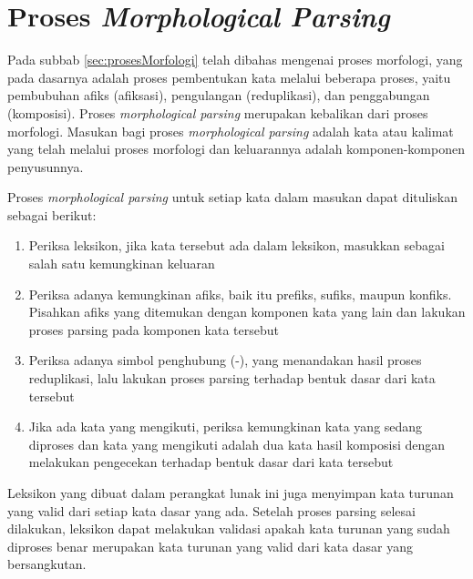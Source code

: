 \section{Proses \textit{Morphological Parsing}}
\label{sec:morphologicalParsing}

Pada subbab \ref{sec:prosesMorfologi} telah dibahas mengenai proses morfologi, yang pada dasarnya adalah proses pembentukan kata melalui beberapa proses, yaitu pembubuhan afiks (afiksasi), pengulangan (reduplikasi), dan penggabungan (komposisi). Proses \textit{morphological parsing} merupakan kebalikan dari proses morfologi. Masukan bagi proses \textit{morphological parsing} adalah kata atau kalimat yang telah melalui proses morfologi dan keluarannya adalah komponen-komponen penyusunnya.

Proses \textit{morphological parsing} untuk setiap kata dalam masukan dapat dituliskan sebagai berikut:
\begin{enumerate}
	\item Periksa leksikon, jika kata tersebut ada dalam leksikon, masukkan sebagai salah satu kemungkinan keluaran
	\item Periksa adanya kemungkinan afiks, baik itu prefiks, sufiks, maupun konfiks. Pisahkan afiks yang ditemukan dengan komponen kata yang lain dan lakukan proses parsing pada komponen kata tersebut
	\item Periksa adanya simbol penghubung (-), yang menandakan hasil proses reduplikasi, lalu lakukan proses parsing terhadap bentuk dasar dari kata tersebut
	\item Jika ada kata yang mengikuti, periksa kemungkinan kata yang sedang diproses dan kata yang mengikuti adalah dua kata hasil komposisi dengan melakukan pengecekan terhadap bentuk dasar dari kata tersebut
\end{enumerate}

Leksikon yang dibuat dalam perangkat lunak ini juga menyimpan kata turunan yang valid dari setiap kata dasar yang ada. Setelah proses parsing selesai dilakukan, leksikon dapat melakukan validasi apakah kata turunan yang sudah diproses benar merupakan kata turunan yang valid dari kata dasar yang bersangkutan. 

